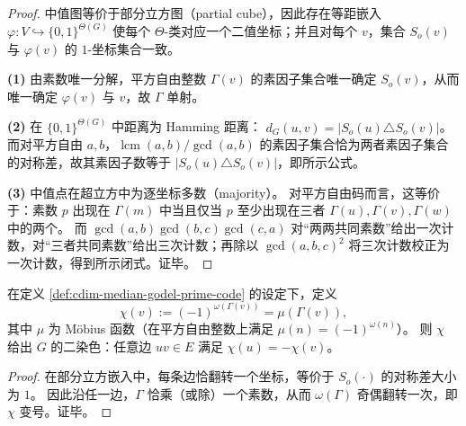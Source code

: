 \begin{proof}
中值图等价于部分立方图（partial cube），因此存在等距嵌入
\(
\varphi:V\hookrightarrow\{0,1\}^{\Theta(G)}
\)
使每个 \(\Theta\)-类对应一个二值坐标；并且对每个 \(v\)，集合 \(S_o(v)\) 与 \(\varphi(v)\) 的 \(1\)-坐标集合一致。
\par
\textbf{(1)} 由素数唯一分解，平方自由整数 \(\Gamma(v)\) 的素因子集合唯一确定 \(S_o(v)\)，从而唯一确定 \(\varphi(v)\) 与 \(v\)，故 \(\Gamma\) 单射。
\par
\textbf{(2)} 在 \(\{0,1\}^{\Theta(G)}\) 中距离为 Hamming 距离：
\(
d_G(u,v)=|S_o(u)\triangle S_o(v)|
\)。
而对平方自由 \(a,b\)，\(\operatorname{lcm}(a,b)/\gcd(a,b)\) 的素因子集合恰为两者素因子集合的对称差，故其素因子数等于 \(|S_o(u)\triangle S_o(v)|\)，即所示公式。
\par
\textbf{(3)} 中值点在超立方中为逐坐标多数（majority）。
对平方自由码而言，这等价于：素数 \(p\) 出现在 \(\Gamma(m)\) 中当且仅当 \(p\) 至少出现在三者 \(\Gamma(u),\Gamma(v),\Gamma(w)\) 中的两个。
而
\(
\gcd(a,b)\gcd(b,c)\gcd(c,a)
\)
对“两两共同素数”给出一次计数，对“三者共同素数”给出三次计数；再除以 \(\gcd(a,b,c)^2\) 将三次计数校正为一次计数，得到所示闭式。证毕。
\end{proof}

\begin{corollary}\label{cor:cdim-median-mobius-bipartite-coloring}
在定义 \ref{def:cdim-median-godel-prime-code} 的设定下，定义
\[
\chi(v):=(-1)^{\omega(\Gamma(v))}=\mu(\Gamma(v)),
\]
其中 \(\mu\) 为 Möbius 函数（在平方自由整数上满足 \(\mu(n)=(-1)^{\omega(n)}\)）。
则 \(\chi\) 给出 \(G\) 的二染色：任意边 \(uv\in E\) 满足 \(\chi(u)=-\chi(v)\)。
\end{corollary}

\begin{proof}
在部分立方嵌入中，每条边恰翻转一个坐标，等价于 \(S_o(\cdot)\) 的对称差大小为 \(1\)。
因此沿任一边，\(\Gamma\) 恰乘（或除）一个素数，从而 \(\omega(\Gamma)\) 奇偶翻转一次，即 \(\chi\) 变号。证毕。
\end{proof}


